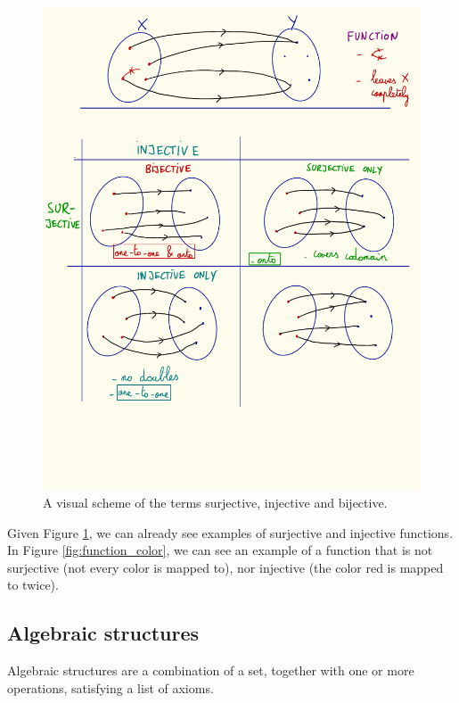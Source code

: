         \begin{figure}[H] \centering
            \includegraphics{images/sur_in_bi}
            \caption{A visual scheme of the terms surjective, injective and bijective.}
            \label{fig:sur_in_bi}
        \end{figure}

        Given Figure \ref{fig:sur_in_bi}, we can already see examples of surjective and injective functions. In Figure \ref{fig:function_color}, we can see an example of a function that is not surjective (not every color is mapped to), nor injective (the color red is mapped to twice). \\

    \subsection{Algebraic structures}
        Algebraic structures are a combination of a set, together with one or more operations, satisfying a list of axioms.

